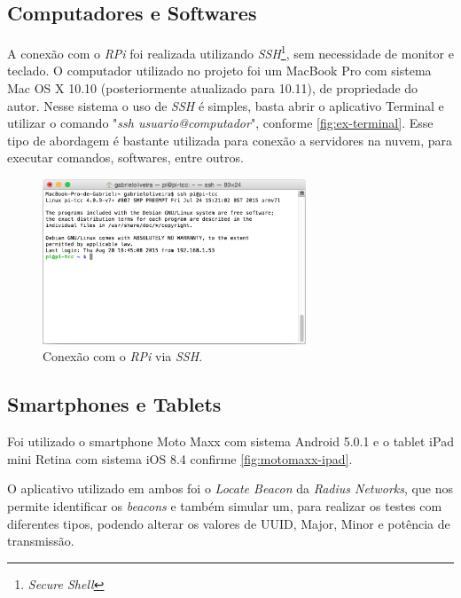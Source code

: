 \documentclass[
		12pt,				%
		openright,			%
		oneside,			%
		a4paper,			%
		chapter=TITLE,		%
		english,			%
		brazil				%
	]{abntex2}
\begin{document}
\subsection{Computadores e Softwares}\label{sec:comp-softwares}

A conexão com o \textit{RPi} foi realizada utilizando \textit{SSH}\footnote{\textit{Secure Shell}}, sem necessidade de monitor e teclado. O computador utilizado no projeto foi um MacBook Pro com sistema Mac OS X 10.10 (posteriormente atualizado para 10.11), de propriedade do autor. Nesse sistema o uso de \textit{SSH} é simples, basta abrir o aplicativo Terminal e utilizar o comando "\textit{ssh usuario@computador}", conforme \autoref{fig:ex-terminal}. Esse tipo de abordagem é bastante utilizada para conexão a servidores na nuvem, para executar comandos, softwares, entre outros.

\begin{figure}[htb]
	\caption{\label{fig:ex-terminal}Conexão com o \textit{RPi} via \textit{SSH}.}
	\begin{center}
		\includegraphics[width=0.7\textwidth]{img/terminal-pi.png}
	\end{center}
\end{figure}

\subsection{Smartphones e Tablets}\label{sec:smartphone-tablets}

Foi utilizado o smartphone Moto Maxx com sistema Android 5.0.1 e o tablet iPad mini Retina com sistema iOS 8.4 confirme \autoref{fig:motomaxx-ipad}. 

O aplicativo utilizado em ambos foi o \textit{Locate Beacon} da \textit{Radius Networks}, que nos permite identificar os \textit{beacons} e também simular um, para realizar os testes com diferentes tipos, podendo alterar os valores de UUID, Major, Minor e potência de transmissão. 
\end{document}
